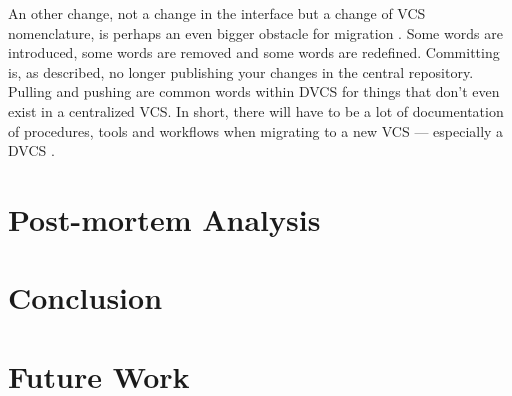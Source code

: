 \documentclass{llncs}
\begin{document}
An other change, not a change in the interface but a change of VCS
nomenclature, is perhaps an even bigger obstacle for migration
\cite{bird09}. Some words are introduced, some words are removed and
some words are redefined. Committing is, as described, no longer
publishing your changes in the central repository. Pulling and pushing
are common words within DVCS for things that don't even exist in a
centralized VCS. In short, there will have to be a lot of
documentation of procedures, tools and workflows when migrating to a
new VCS --- especially a DVCS \cite{alwis09}.

%
%
%

\section{Post-mortem Analysis}

\section{Conclusion}

\section{Future Work}

 

\end{document}
